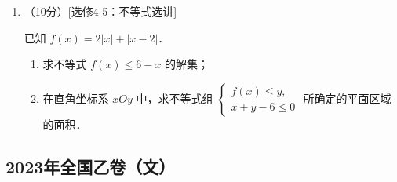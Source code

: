 \begin{description}
\begin{enumerate}[leftmargin=5pt]
        \begin{enumerate}[label=(\arabic*)]
            \item 求 $\alpha$；
            \item 求 $C_1$ 的极坐标方程．
        \end{enumerate}

        \item （10分）[选修4-5：不等式选讲]

        已知 $f(x)=2|x|+|x-2|$．

        \begin{enumerate}[label=(\arabic*)]
            \item 求不等式 $f(x)\leqslant6-x$ 的解集；
            \item 在直角坐标系 $xOy$ 中，求不等式组 $\begin{cases}f(x)\leqslant y,\\x+y-6\leqslant0\end{cases}$ 所确定的平面区域的面积．
        \end{enumerate}
    \end{enumerate}
\end{description}
\clearpage


\subsection{2023年全国乙卷（文）}\label{gk:2023年全国乙卷（文）}

